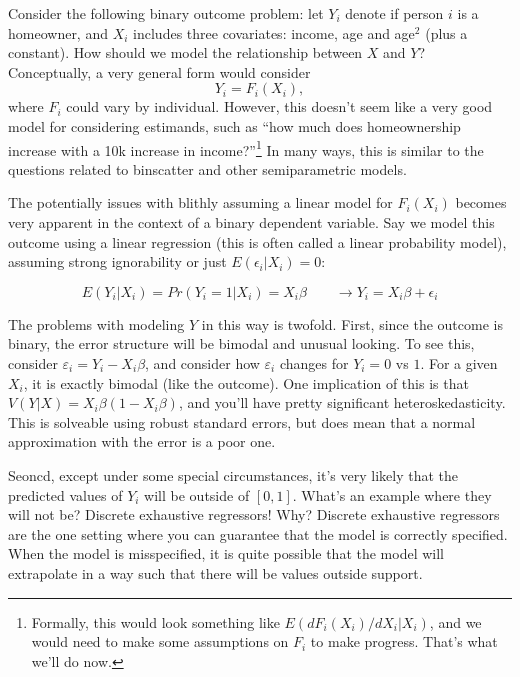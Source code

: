 \documentclass{tufte-handout}
\theoremstyle{break}
\begin{document}
Consider the following binary outcome problem: let $Y_{i}$ denote if person $i$ is a homeowner, and $X_{i}$ includes three covariates: income, age and age$^{2}$ (plus a constant). How should we model the relationship between $X$ and $Y$? Conceptually, a very general form would consider 
\begin{equation*}
    Y_{i} = F_{i}(X_{i}),
\end{equation*}
where $F_{i}$ could vary by individual. However, this doesn't seem like a very good model for considering estimands, such as ``how much does homeownership increase with a 10k increase in income?''\footnote{Formally, this would look something like $E(dF_{i}(X_{i})/dX_{i} | X_{i})$, and we would need to make some assumptions on $F_{i}$ to make progress. That's what we'll do now.} In many ways, this is similar to the questions related to binscatter and other semiparametric models. 

The potentially issues with blithly assuming a linear model for $F_{i}(X_{i})$ becomes very apparent in the context of a binary dependent variable. Say we model this outcome using a linear regression (this is often called a linear probability model), assuming strong ignorability or just $E(\epsilon_{i} | X_{i}) = 0$:
     
\begin{equation}
    E(Y_{i}|X_{i}) = Pr(Y_{i} = 1 | X_{i}) = X_{i}\beta \qquad \rightarrow Y_{i} = X_{i}\beta + \epsilon_{i}
\end{equation}

The problems with modeling $Y$ in this way is twofold. First, since the outcome is  binary, the error structure will be bimodal and unusual looking. To see this, consider $\varepsilon_{i} = Y_{i} - X_{i}\beta$, and consider how $\varepsilon_{i}$ changes for $Y_{i} = 0$ vs $1$. For a given $X_{i}$, it is exactly bimodal (like the outcome). One implication of this is that $V(Y|X) = X_{i}\beta (1- X_{i}\beta)$, and you'll have pretty significant heteroskedasticity. This is solveable using robust standard errors, but does mean that a normal approximation with the error is a poor one.

Seoncd, except under some special circumstances, it's very likely that the predicted values of $Y_{i}$ will be outside of $[0,1]$.  What's an example where they will not be? Discrete exhaustive regressors!  Why? Discrete exhaustive regressors are the one setting where you can guarantee that the model is correctly specified. When the model is misspecified, it is quite possible that the model will extrapolate in a way such that there will be values outside support.
\end{document}
